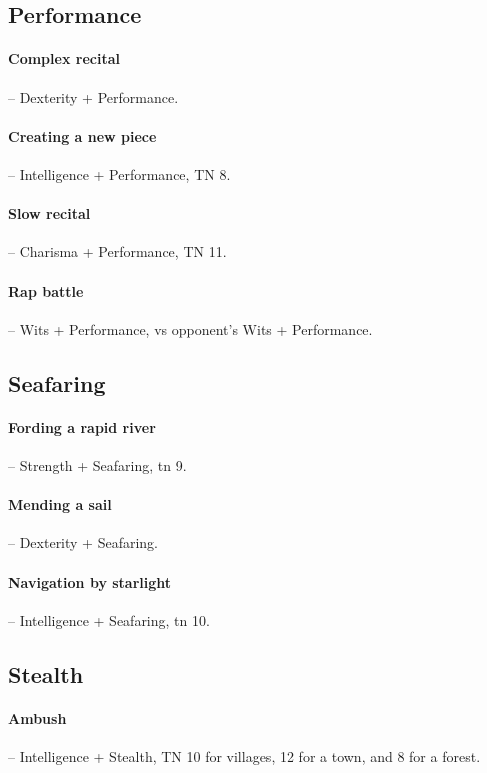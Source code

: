 \begin{multicols}{2}
\subsection{Performance}

\paragraph{Complex recital} -- Dexterity + Performance.

\paragraph{Creating a new piece} -- Intelligence + Performance, TN 8.

\paragraph{Slow recital} -- Charisma + Performance, TN 11.

\paragraph{Rap battle} -- Wits + Performance, vs opponent's Wits + Performance.

\subsection{Seafaring}

\paragraph{Fording a rapid river} -- Strength + Seafaring, \gls{tn} 9.

\paragraph{Mending a sail} -- Dexterity + Seafaring.

\paragraph{Navigation by starlight} -- Intelligence + Seafaring, \gls{tn} 10.

\subsection{Stealth}

\paragraph{Ambush} -- Intelligence + Stealth, TN 10 for villages, 12 for a town, and 8 for a forest.


\end{multicols}
